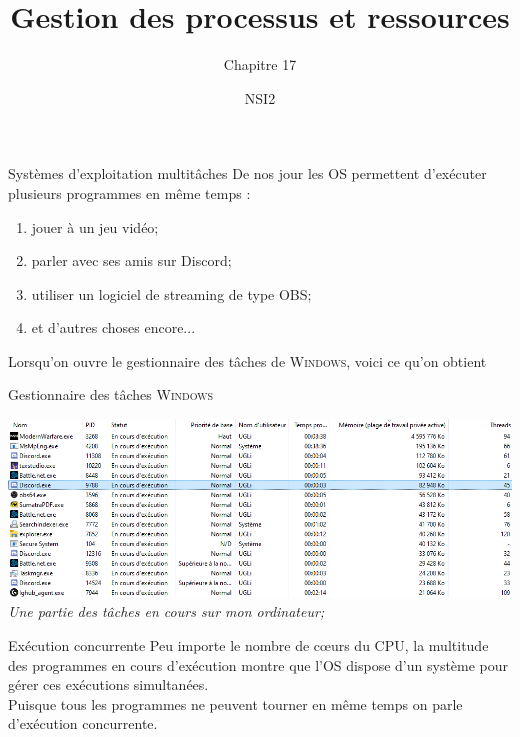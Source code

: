 \documentclass[10pt]{beamer}
\title{Gestion des processus et ressources}
\subtitle{Chapitre 17}
\author{NSI2}
\begin{document}
\maketitle
{}
\begin{frame}{Systèmes d'exploitation multitâches}
De nos jour les OS permettent d'exécuter plusieurs programmes en même temps :\\

\begin{enumerate}[--]
	\item jouer à un jeu vidéo;
    \item parler avec ses amis sur Discord;
    \item utiliser un logiciel de streaming de type OBS;
    \item et d'autres choses encore...
\end{enumerate}
Lorsqu'on ouvre le gestionnaire des tâches de \textsc{Windows}, voici ce qu'on obtient
\end{frame}
\begin{frame}{Gestionnaire des tâches \textsc{Windows}}
\begin{center}
\includegraphics[width=\linewidth]{img/gest}\\

\small \textit{Une partie des tâches en cours sur mon ordinateur;}
\end{center}
\end{frame}
\begin{frame}{Exécution concurrente}
Peu importe le nombre de c\oe urs du CPU, la multitude des programmes en cours d'exécution montre que l'OS dispose d'un système pour gérer ces exécutions simultanées.\\
Puisque tous les programmes ne peuvent \og tourner en même temps\fg{} on parle d'\alert{exécution concurrente}.
\end{frame}
\end{document}
